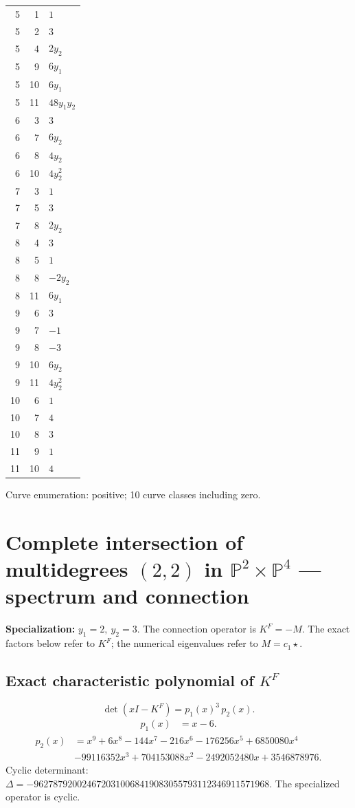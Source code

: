\documentclass[10pt,a4paper]{article}
\begin{document}
{\begin{longtable}{rrp{125mm}}
5 & 1 & $1$\\
5 & 2 & $3$\\
5 & 4 & $2 y_{2}$\\
5 & 9 & $6 y_{1}$\\
5 & 10 & $6 y_{1}$\\
5 & 11 & $48 y_{1} y_{2}$\\
6 & 3 & $3$\\
6 & 7 & $6 y_{2}$\\
6 & 8 & $4 y_{2}$\\
6 & 10 & $4 y_{2}^{2}$\\
7 & 3 & $1$\\
7 & 5 & $3$\\
7 & 8 & $2 y_{2}$\\
8 & 4 & $3$\\
8 & 5 & $1$\\
8 & 8 & $- 2 y_{2}$\\
8 & 11 & $6 y_{1}$\\
9 & 6 & $3$\\
9 & 7 & $-1$\\
9 & 8 & $-3$\\
9 & 10 & $6 y_{2}$\\
9 & 11 & $4 y_{2}^{2}$\\
10 & 6 & $1$\\
10 & 7 & $4$\\
10 & 8 & $3$\\
11 & 9 & $1$\\
11 & 10 & $4$\\
\end{longtable}}
Curve enumeration: positive; 10 curve classes including zero.
\clearpage\section*{Complete intersection of multidegrees $(2,2)$ in $\mathbb P^{2}\times \mathbb P^{4}$ --- spectrum and connection}
\textbf{Specialization:} $y_1=2,\ y_2=3$. The connection operator is $K^F=-M$. The exact factors below refer to $K^F$; the numerical eigenvalues refer to $M=c_1\star$.
\subsection*{Exact characteristic polynomial of $K^F$}
\[\det(xI-K^F)=p_{1}(x)^{3}\,p_{2}(x).\]
\[\begin{aligned}p_{1}(x)&=x - 6.\end{aligned}\]
\[\begin{aligned}p_{2}(x)&=x^{9} + 6 x^{8} - 144 x^{7} - 216 x^{6} - 176256 x^{5} + 6850080 x^{4}\\&- 99116352 x^{3} + 704153088 x^{2} - 2492052480 x + 3546878976.\end{aligned}\]
Cyclic determinant: $\Delta=-9627879200246720310068419083055793112346911571968$. The specialized operator is cyclic.
\end{document}
